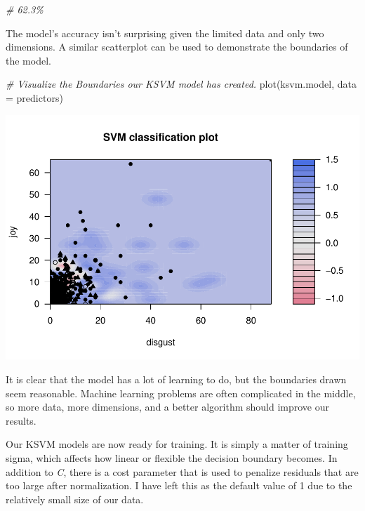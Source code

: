 \documentclass[
]{article}
\newenvironment{Shaded}{\begin{snugshade}}{\end{snugshade}}
\newcommand{\AttributeTok}[1]{\textcolor[rgb]{0.77,0.63,0.00}{#1}}
\newcommand{\CommentTok}[1]{\textcolor[rgb]{0.56,0.35,0.01}{\textit{#1}}}
\newcommand{\FunctionTok}[1]{\textcolor[rgb]{0.00,0.00,0.00}{#1}}
\newcommand{\NormalTok}[1]{#1}
\begin{document}
\begin{Shaded}
\begin{Highlighting}[]
\CommentTok{\# 62.3\%}
\end{Highlighting}
\end{Shaded}

The model's accuracy isn't surprising given the limited data and only
two dimensions. A similar scatterplot can be used to demonstrate the
boundaries of the model.

\begin{Shaded}
\begin{Highlighting}[]
\CommentTok{\# Visualize the Boundaries our KSVM model has created.}
\FunctionTok{plot}\NormalTok{(ksvm.model, }\AttributeTok{data =}\NormalTok{ predictors)}
\end{Highlighting}
\end{Shaded}

\includegraphics{report_files/figure-latex/illustrate_svm_boudaries-1.pdf}

It is clear that the model has a lot of learning to do, but the
boundaries drawn seem reasonable. Machine learning problems are often
complicated in the middle, so more data, more dimensions, and a better
algorithm should improve our results.

Our KSVM models are now ready for training. It is simply a matter of
training sigma, which affects how linear or flexible the decision
boundary becomes. In addition to \emph{C}, there is a cost parameter
that is used to penalize residuals that are too large after
normalization. I have left this as the default value of 1 due to the
relatively small size of our data.
\end{document}
